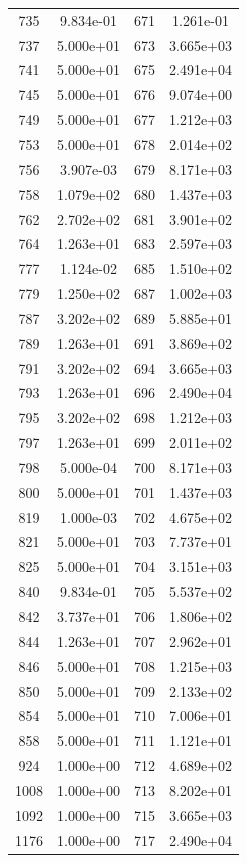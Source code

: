 \documentclass[12pt]{article}
\begin{document}
\begin{longtable}{@{}cccc@{}}
735 & 9.834e-01 & 671 & 1.261e-01 \\
737 & 5.000e+01 & 673 & 3.665e+03 \\
741 & 5.000e+01 & 675 & 2.491e+04 \\
745 & 5.000e+01 & 676 & 9.074e+00 \\
749 & 5.000e+01 & 677 & 1.212e+03 \\
753 & 5.000e+01 & 678 & 2.014e+02 \\
756 & 3.907e-03 & 679 & 8.171e+03 \\
758 & 1.079e+02 & 680 & 1.437e+03 \\
762 & 2.702e+02 & 681 & 3.901e+02 \\
764 & 1.263e+01 & 683 & 2.597e+03 \\
777 & 1.124e-02 & 685 & 1.510e+02 \\
779 & 1.250e+02 & 687 & 1.002e+03 \\
787 & 3.202e+02 & 689 & 5.885e+01 \\
789 & 1.263e+01 & 691 & 3.869e+02 \\
791 & 3.202e+02 & 694 & 3.665e+03 \\
793 & 1.263e+01 & 696 & 2.490e+04 \\
795 & 3.202e+02 & 698 & 1.212e+03 \\
797 & 1.263e+01 & 699 & 2.011e+02 \\
798 & 5.000e-04 & 700 & 8.171e+03 \\
800 & 5.000e+01 & 701 & 1.437e+03 \\
819 & 1.000e-03 & 702 & 4.675e+02 \\
821 & 5.000e+01 & 703 & 7.737e+01 \\
825 & 5.000e+01 & 704 & 3.151e+03 \\
840 & 9.834e-01 & 705 & 5.537e+02 \\
842 & 3.737e+01 & 706 & 1.806e+02 \\
844 & 1.263e+01 & 707 & 2.962e+01 \\
846 & 5.000e+01 & 708 & 1.215e+03 \\
850 & 5.000e+01 & 709 & 2.133e+02 \\
854 & 5.000e+01 & 710 & 7.006e+01 \\
858 & 5.000e+01 & 711 & 1.121e+01 \\
924 & 1.000e+00 & 712 & 4.689e+02 \\
1008 & 1.000e+00 & 713 & 8.202e+01 \\
1092 & 1.000e+00 & 715 & 3.665e+03 \\
1176 & 1.000e+00 & 717 & 2.490e+04 \\

\end{longtable}
\end{document}
